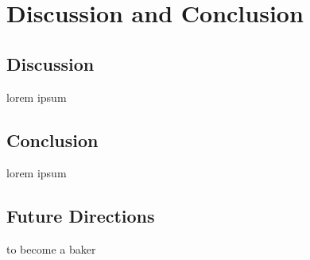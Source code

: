 \chapter{Discussion and Conclusion}

\section{Discussion}
lorem ipsum

\section{Conclusion}
lorem ipsum

\section{Future Directions}
to become a baker